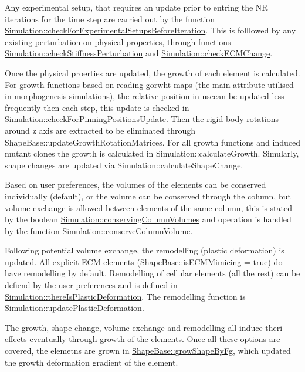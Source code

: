 Any experimental setup, that requires an update prior to entring the N\+R iterations for the time step are carried out by the function \hyperlink{classSimulation_aa9ad0627365ad5d465b273183c7db344}{Simulation\+::check\+For\+Experimental\+Setups\+Before\+Iteration}. This is folllowed by any existing perturbation on physical properties, through functions \hyperlink{classSimulation_a361530c38e215fd901d5e8a0ef051386}{Simulation\+::check\+Stiffness\+Perturbation} and \hyperlink{classSimulation_ae096c8a7fcc6e921415d1be317526d02}{Simulation\+::check\+E\+C\+M\+Change}. ~\newline


Once the physical proerties are updated, the growth of each element is calculated. For growth functions based on reading gorwht maps (the main attribute utilised in morphogenesis simulations), the relative position in usecan be updated less frequently then each step, this update is checked in Simulation\+::check\+For\+Pinning\+Positions\+Update. Then the rigid body rotations around z axis are extracted to be eliminated through Shape\+Base\+::update\+Growth\+Rotation\+Matrices. For all growth functions and induced mutant clones the growth is calculated in Simulation\+::calculate\+Growth. Simularly, shape changes are updated via Simulation\+::calculate\+Shape\+Change. ~\newline


Based on user preferences, the volumes of the elements can be conserved individually (default), or the volume can be conserved through the column, but volume exchange is allowed between elements of the same column, this is stated by the boolean \hyperlink{classSimulation_a1dd66be606281f44c05ec6b4f8eed882}{Simulation\+::conserving\+Column\+Volumes} and operation is handled by the function Simulation\+::conserve\+Column\+Volume. ~\newline


Following potential volume exchange, the remodelling (plastic deformation) is updated. All explicit E\+C\+M elements (\hyperlink{classShapeBase_a5e442b31d2341cbe477d7c33195a576c}{Shape\+Base\+::is\+E\+C\+M\+Mimicing} = true) do have remodelling by default. Remodelling of cellular elements (all the rest) can be defiend by the user preferences and is defined in \hyperlink{classSimulation_ab0d54e9e505f3701cf5ca8b0ac0df00a}{Simulation\+::there\+Is\+Plastic\+Deformation}. The remodelling function is \hyperlink{classSimulation_aba920b0ae2806ea3890cbe2b819977fe}{Simulation\+::update\+Plastic\+Deformation}.

The growth, shape change, volume exchange and remodelling all induce theri effects eventually through growth of the elements. Once all these options are covered, the elemetns are grown in \hyperlink{classShapeBase_a29ee0eeca30fdd381d294b383c3baf0c}{Shape\+Base\+::grow\+Shape\+By\+Fg}, which updated the growth deformation gradient of the element. ~\newline



